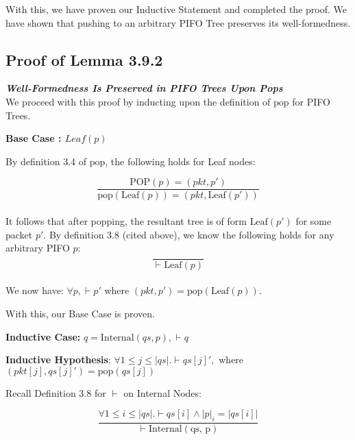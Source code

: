 \documentclass{article}
\begin{document}
\noindent With this, we have proven our Inductive Statement and completed the proof. We have shown that pushing to an arbitrary PIFO Tree preserves its well-formedness.\\[-10pt]

\subsection{Proof of Lemma 3.9.2}
\noindent \textit{\textbf{Well-Formedness Is Preserved in PIFO Trees Upon Pops}}\\[5pt]

\noindent We proceed with this proof by inducting upon the definition of $\text{pop}$ for PIFO Trees.\newline

\noindent \textbf{Base Case : $Leaf(p)$}\newline

\noindent By definition 3.4 of $\text{pop}$, the following holds for Leaf nodes:

$$\frac{\text{POP}(p) = (pkt, p')}{\text{pop}(\text{Leaf}(p)) = (pkt, \text{Leaf}(p'))}$$\\[-15pt]

\noindent It follows that after popping, the resultant tree is of form $\text{Leaf}(p')$ for some packet $p'$. By definition 3.8 (cited above), we know the following holds for any arbitrary PIFO $p$:\\[-20pt]

$$\frac{}{\vdash \text{Leaf}(p)}$$\\[-10pt]

\noindent We now have: $\forall p, \vdash p'$ where $(pkt, p') = \text{pop}(\text{Leaf}(p))$.\newline

\noindent With this, our Base Case is proven.\newline


\noindent \textbf{Inductive Case:} $q = \text{Internal}(qs, p), \vdash q$\newline

\noindent \textbf{Inductive Hypothesis}: $\forall 1 \leq j \leq |qs|. \vdash qs[j]',$ where $(pkt[j], qs[j]') = \text{pop}(qs[j])$\newline

\noindent Recall Definition 3.8 for $\vdash$ on Internal Nodes:

$$\frac{\forall 1 \leq i \leq |qs|. \vdash qs[i] \land |p|_i = |qs[i]|}{\vdash \text{Internal}(\text{qs, p})}$$\\[-10pt]
\end{document}
